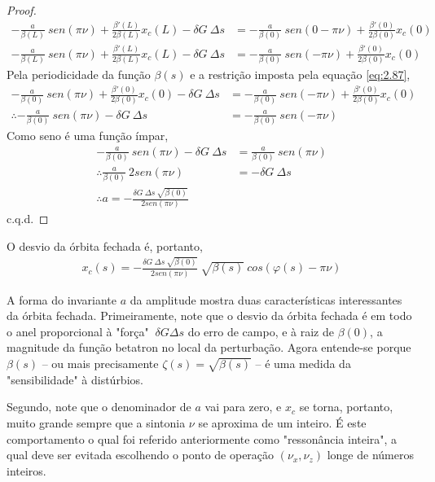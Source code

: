 \begin{proof}
\begin{align*}
		-\frac{a}{\beta(L)}\ sen(\pi\nu) + \frac{\beta'(L)}{2\beta(L)}x_c(L) - \delta G\ \Delta s &= -\frac{a}{\beta(0)}\ sen(0-\pi\nu) + \frac{\beta'(0)}{2\beta(0)}x_c(0)\\
		-\frac{a}{\beta(L)}\ sen(\pi\nu) + \frac{\beta'(L)}{2\beta(L)}x_c(L) - \delta G\ \Delta s &= -\frac{a}{\beta(0)}\ sen(-\pi\nu) + \frac{\beta'(0)}{2\beta(0)}x_c(0)
	\end{align*}
	Pela periodicidade da função $\beta(s)$ e a restrição imposta pela equação \eqref{eq:2.87},
	\begin{align*}
		-\frac{a}{\beta(0)}\ sen(\pi\nu) + \frac{\beta'(0)}{2\beta(0)}x_c(0) - \delta G\ \Delta s &= -\frac{a}{\beta(0)}\ sen(-\pi\nu) + \frac{\beta'(0)}{2\beta(0)}x_c(0)\\
		\therefore -\frac{a}{\beta(0)}\ sen(\pi\nu) - \delta G\ \Delta s &= -\frac{a}{\beta(0)}\ sen(-\pi\nu)
	\end{align*}
	Como seno é uma função ímpar,
	\begin{align*}
		-\frac{a}{\beta(0)}\ sen(\pi\nu) - \delta G\ \Delta s &= \frac{a}{\beta(0)}\ sen(\pi\nu)\\
		\therefore \frac{a}{\beta(0)}\ 2sen(\pi\nu) &= -\delta G\ \Delta s\\
		\therefore a = -\frac{\delta G\ \Delta s\ \sqrt{\beta(0)}}{2 sen(\pi \nu)}
	\end{align*}
	c.q.d.
\end{proof}

O desvio da órbita fechada é, portanto,
\begin{align}
	x_c(s) = -\frac{\delta G\ \Delta s\ \sqrt{\beta(0)}}{2 sen(\pi \nu)}\ \sqrt{\beta(s)}\ cos(\varphi(s)-\pi\nu)\label{eq:2.92}
\end{align}

A forma do invariante $a$ da amplitude mostra duas características interessantes da órbita fechada. Primeiramente, note que o desvio da órbita fechada é em todo o anel proporcional à "força" $\ \delta G \Delta s$ do erro de campo, e à raiz de $\beta(0)$, a magnitude da função betatron no local da perturbação. Agora entende-se porque $\beta(s)$ -- ou mais precisamente $\zeta(s) = \sqrt{\beta(s)}$ -- é uma medida da "sensibilidade" à distúrbios.

Segundo, note que o denominador de $a$ vai para zero, e $x_c$ se torna, portanto, muito grande sempre que a sintonia $\nu$ se aproxima de um inteiro. É este comportamento o qual foi referido anteriormente como "ressonância inteira", a qual deve ser evitada escolhendo o ponto de operação $(\nu_x,\nu_z)$ longe de números inteiros.

